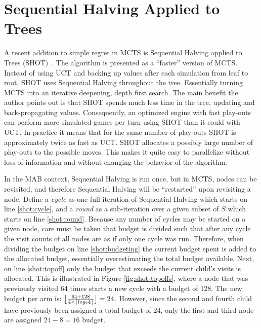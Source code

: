 \documentclass{kecsmstr}
\DeclarePairedDelimiter{\ceil}{\lceil}{\rceil}
\DeclarePairedDelimiter{\floor}{\lfloor}{\rfloor}
\begin{document}
\section{Sequential Halving Applied to Trees}
\label{sec:SHOT}

A recent addition to simple regret in MCTS is Sequential Halving applied to Trees (SHOT)~. The algorithm is presented as a ``faster'' version of MCTS. Instead of using UCT and backing up values after each simulation from leaf to root, SHOT uses Sequential Halving throughout the tree. Essentially turning MCTS into an iterative deepening, depth first search. The main benefit the author points out is that SHOT spends much less time in the tree, updating and back-propagating values. Consequently, an optimized engine with fast play-outs can perform more simulated games per turn using SHOT than it could with UCT. In practice it means that for the same number of play-outs SHOT is approximately twice as fast as UCT. SHOT allocates a
possibly large number of play-outs to the possible moves. This makes it quite easy to parallelize without loss of information and without changing the behavior of the algorithm.

In the MAB context, Sequential Halving is run once, but in MCTS, nodes can be revisited, and therefore Sequential Halving will be ``restarted'' upon revisiting a node. Define a \emph{cycle} as one full iteration of Sequential Halving which starts on line \ref{shot:cycle}, and a \emph{round} as a sub-iteration over a given subset of $S$ which starts on line \ref{shot:round}. Because any number of cycles may be started on a given node, care must be taken that budget is divided such that after any cycle the visit counts of all nodes are as if only one cycle was run. Therefore, when dividing the budget on line \ref{shot:budgeting} the current budget spent is added to the allocated budget, essentially overestimating the total budget available. Next, on line \ref{shot:topoff} only the budget that exceeds the current child's visits is allocated. This is illustrated in Figure \ref{fig:shot-topoffs}, where a node that was previously visited 64 times starts a new cycle with a budget of 128. The new budget per arm is: $\floor[\big]{\frac{64 + 128}{4\times\ceil{log_2{4}}}} = 24$. However, since the second and fourth child have previously been assigned a total budget of 24, only the first and third node are assigned $24-8=16$ budget.
\end{document}
